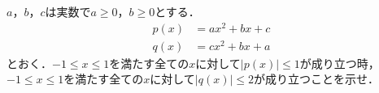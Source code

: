 \documentclass[../../main.tex]{subfiles}
\begin{document}
$a$，$b$，$c$は実数で$a\ge 0$，$b\ge 0$とする．
\begin{align*}
  p(x) & =ax^2+bx+c \\
  q(x) & =cx^2+bx+a
\end{align*}
とおく．$-1\le x\le 1$を満たす全ての$x$に対して$|p(x)|\le 1$が成り立つ時，$-1\le x\le 1$を満たす全ての$x$に対して$|q(x)|\le 2$が成り立つことを示せ．
\end{document}
